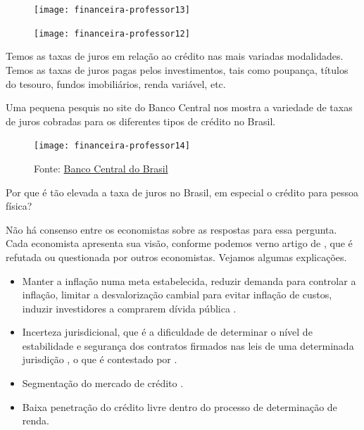 \begin{paginatexto}
\begin{figure}[H]
\centering

\texttt{[image: financeira-professor13]}
\end{figure}

\begin{figure}[H]
\centering

\texttt{[image: financeira-professor12]}
\end{figure}


Temos as taxas de juros em relação ao crédito nas mais variadas modalidades. Temos as taxas de juros pagas pelos investimentos, tais como poupança, títulos do tesouro, fundos imobiliários, renda variável, etc.

Uma pequena pesquis  no site do Banco Central nos mostra a variedade de taxas de juros cobradas para os diferentes tipos de crédito no Brasil.

\begin{figure}[H]
\centering

\texttt{[image: financeira-professor14]}

\caption{Fonte: \href{https://www.bcb.gov.br/estatisticas/txjuros}{Banco Central do Brasil}}
\end{figure}

Por que é tão elevada a taxa de juros no Brasil, em especial o crédito para pessoa física?

Não há consenso entre os economistas sobre as respostas para essa pergunta. Cada economista apresenta sua visão, conforme podemos verno artigo de \cite{BARBOZA2015}, que é refutada ou questionada por outros economistas. Vejamos algumas explicações.

\begin{itemize}
  \item Manter a inflação numa meta estabelecida, reduzir demanda para controlar a inflação, limitar a desvalorização cambial para evitar inflação de custos, induzir investidores a comprarem dívida pública \citep{bresser2002}.

  \item Incerteza jurisdicional, que é a dificuldade de determinar o nível de estabilidade e segurança dos contratos firmados nas leis de uma determinada jurisdição \citep{arida2004}, o que é contestado por \cite{gonccalves2007}.

  \item Segmentação do mercado de crédito \citep{BARBOZA2015}.

  \item Baixa penetração do crédito livre dentro do processo de determinação de renda.


\end{itemize}
\end{paginatexto}
